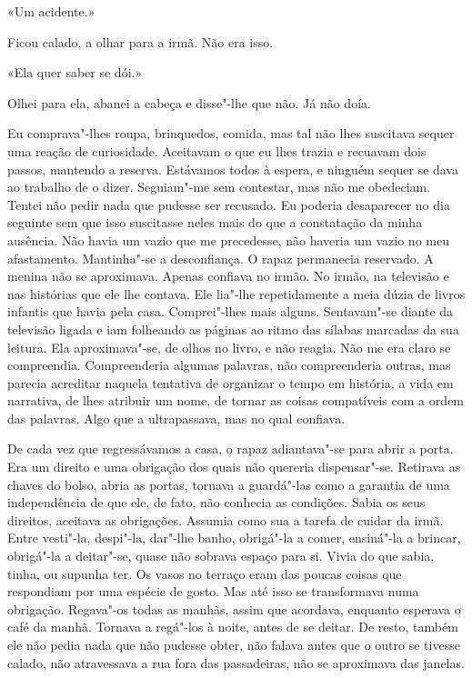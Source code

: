 «Um acidente.»

Ficou calado, a olhar para a irmã. Não era isso.

«Ela quer saber se dói.»

Olhei para ela, abanei a cabeça e disse"-lhe que não. Já não doía.

Eu comprava"-lhes roupa, brinquedos, comida, mas tal não lhes suscitava
sequer uma reação de curiosidade. Aceitavam o que eu lhes trazia e
recuavam dois passos, mantendo a reserva. Estávamos todos à espera, e
ninguém sequer se dava ao trabalho de o dizer. Seguiam"-me sem
contestar, mas não me obedeciam. Tentei não pedir nada que pudesse ser
recusado. Eu poderia desaparecer no dia seguinte sem que isso suscitasse
neles mais do que a constatação da minha ausência. Não havia um vazio
que me precedesse, não haveria um vazio no meu afastamento. Mantinha"-se
a desconfiança. O rapaz permanecia reservado. A menina não se
aproximava. Apenas confiava no irmão. No irmão, na televisão e nas
histórias que ele lhe contava. Ele lia"-lhe repetidamente a meia dúzia
de livros infantis que havia pela casa. Comprei"-lhes mais alguns.
Sentavam"-se diante da televisão ligada e iam folheando as páginas ao
ritmo das sílabas marcadas da sua leitura. Ela aproximava"-se, de olhos
no livro, e não reagia. Não me era claro se compreendia. Compreenderia
algumas palavras, não compreenderia outras, mas parecia acreditar
naquela tentativa de organizar o tempo em história, a vida em narrativa,
de lhes atribuir um nome, de tornar as coisas compatíveis com a ordem
das palavras. Algo que a ultrapassava, mas no qual confiava.

De cada vez que regressávamos a casa, o rapaz adiantava"-se para abrir a
porta. Era um direito e uma obrigação dos quais não quereria
dispensar"-se. Retirava as chaves do bolso, abria as portas, tornava a
guardá"-las como a garantia de uma independência de que ele, de fato,
não conhecia as condições. Sabia os seus direitos, aceitava as
obrigações. Assumia como sua a tarefa de cuidar da irmã. Entre
vesti"-la, despi"-la, dar"-lhe banho, obrigá"-la a comer, ensiná"-la a
brincar, obrigá"-la a deitar"-se, quase não sobrava espaço para si.
Vivia do que sabia, tinha, ou supunha ter. Os vasos no terraço eram das
poucas coisas que respondiam por uma espécie de gosto. Mas até isso se
transformava numa obrigação. Regava"-os todas as manhãs, assim que
acordava, enquanto esperava o café da manhã. Tornava a regá"-los à
noite, antes de se deitar. De resto, também ele não pedia nada que não
pudesse obter, não falava antes que o outro se tivesse calado, não
atravessava a rua fora das passadeiras, não se aproximava das janelas.

